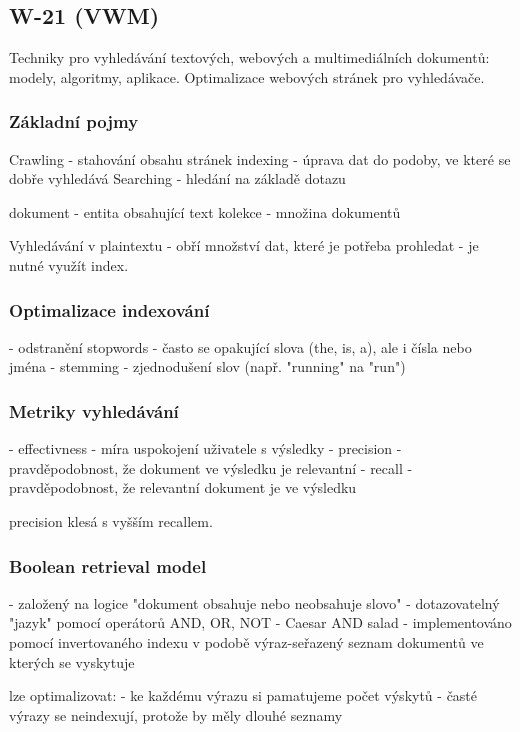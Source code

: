 \subsection{W-21 (VWM)}

Techniky pro vyhledávání textových, webových a multimediálních dokumentů: modely, algoritmy, aplikace. Optimalizace webových stránek pro vyhledávače.

\subsubsection*{Základní pojmy}

Crawling - stahování obsahu stránek
indexing - úprava dat do podoby, ve které se dobře vyhledává
Searching - hledání na základě dotazu

dokument - entita obsahující text
kolekce - množina dokumentů

Vyhledávání v plaintextu - obří množství dat, které je potřeba prohledat - je nutné využít index.

\subsubsection*{Optimalizace indexování}

- odstranění stopwords - často se opakující slova (the, is, a), ale i čísla nebo jména
- stemming - zjednodušení slov (např. "running" na "run")

\subsubsection*{Metriky vyhledávání}

- effectivness - míra uspokojení uživatele s výsledky
- precision - pravděpodobnost, že dokument ve výsledku je relevantní
- recall - pravděpodobnost, že relevantní dokument je ve výsledku

precision klesá s vyšším recallem.

\subsubsection*{Boolean retrieval model}

- založený na logice "dokument obsahuje nebo neobsahuje slovo"
- dotazovatelný "jazyk" pomocí operátorů AND, OR, NOT - Caesar AND salad
- implementováno pomocí invertovaného indexu v podobě výraz-seřazený seznam dokumentů ve kterých se vyskytuje

lze optimalizovat:
- ke každému výrazu si pamatujeme počet výskytů
- časté výrazy se neindexují, protože by měly dlouhé seznamy

